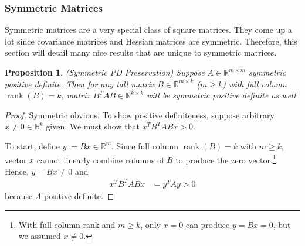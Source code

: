 \documentclass[12pt]{book}
\numberwithin{equation}{section} %
\theoremstyle{plain}
\newtheorem{prop}[thm]{Proposition}
\newtheorem{cor}[thm]{Corollary}
\theoremstyle{definition}
\theoremstyle{remark}
\newcommand{\R}{\mathbb{R}}
\newcommand{\Rm}{\mathbb{R}^m}
\newcommand{\Rk}{\mathbb{R}^k}
\newcommand{\Rmm}{\mathbb{R}^{m\times m}}
\newcommand{\Rkk}{\mathbb{R}^{k\times k}}
\newcommand{\rank}{\operatorname{rank}}
\begin{document}
\clearpage
\subsubsection{Symmetric Matrices}

Symmetric matrices are a very special class of square matrices. They
come up a lot since covariance matrices and Hessian matrices are
symmetric.  Therefore, this section will detail many nice results that
are unique to
symmetric matrices.


\begin{prop}\emph{(Symmetric PD Preservation)}
Suppose $A\in\Rmm$ symmetric positive definite.
Then for any tall matrix $B\in\R^{m\times k}$ ($m\geq k$) with full
column $\rank(B)=k$, matrix $B^TAB\in\Rkk$ will be symmetric positive
definite as well.
\end{prop}
\begin{proof}
Symmetric obvious.
To show positive definiteness, suppose arbitrary $x\neq 0\in\Rk$ given.
We must show that $x^T B^TABx >0$.

To start, define $y:=Bx\in\Rm$.
Since full column $\rank(B)=k$ with $m\geq k$,
vector $x$ cannot linearly combine columns of $B$ to produce the
zero vector.\footnote{%
  With full column rank and $m\geq k$, only $x=0$ can produce $y=Bx=0$,
  but we assumed $x\neq 0$.
}
Hence, $y=Bx\neq 0$ and
\begin{align*}
  x^TB^TABx &= y^TAy > 0
\end{align*}
because $A$ positive definite.
\end{proof}
\end{document}
